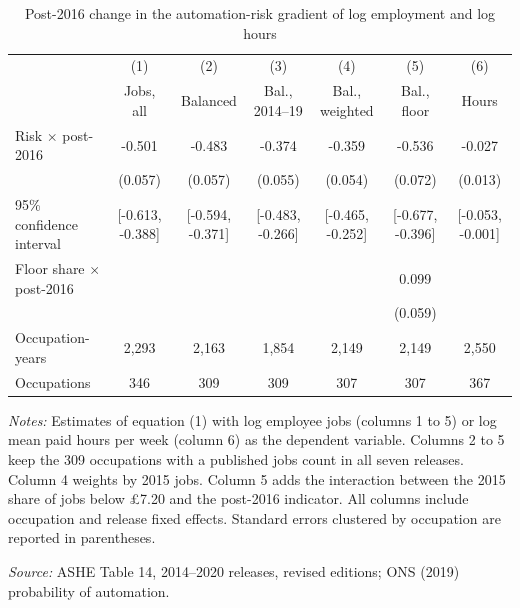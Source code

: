 \begin{table}[!ht]\centering
\caption{Post-2016 change in the automation-risk gradient of log employment and log hours}\label{tab:jobs}
\begin{threeparttable}\scriptsize\setlength{\tabcolsep}{2pt}
\begin{tabular}{lcccccc}\toprule
 & (1) & (2) & (3) & (4) & (5) & (6) \\
 & Jobs, all & Balanced & Bal., 2014--19 & Bal., weighted & Bal., floor & Hours \\ \midrule
Risk $\times$ post-2016 & -0.501 & -0.483 & -0.374 & -0.359 & -0.536 & -0.027 \\
 & (0.057) & (0.057) & (0.055) & (0.054) & (0.072) & (0.013) \\
95\% confidence interval & [-0.613, -0.388] & [-0.594, -0.371] & [-0.483, -0.266] & [-0.465, -0.252] & [-0.677, -0.396] & [-0.053, -0.001] \\
Floor share $\times$ post-2016 & & & & & 0.099 & \\
 & & & & & (0.059) & \\ \addlinespace
Occupation-years & 2,293 & 2,163 & 1,854 & 2,149 & 2,149 & 2,550 \\
Occupations & 346 & 309 & 309 & 307 & 307 & 367 \\
\bottomrule\end{tabular}
\begin{tablenotes}\footnotesize
\item \emph{Notes:} Estimates of equation (1) with log employee jobs (columns 1 to 5) or log mean paid hours per week (column 6) as the dependent variable. Columns 2 to 5 keep the 309 occupations with a published jobs count in all seven releases. Column 4 weights by 2015 jobs. Column 5 adds the interaction between the 2015 share of jobs below \pounds 7.20 and the post-2016 indicator. All columns include occupation and release fixed effects. Standard errors clustered by occupation are reported in parentheses.
\item \emph{Source:} ASHE Table 14, 2014--2020 releases, revised editions; ONS (2019) probability of automation.
\end{tablenotes}\end{threeparttable}\end{table}